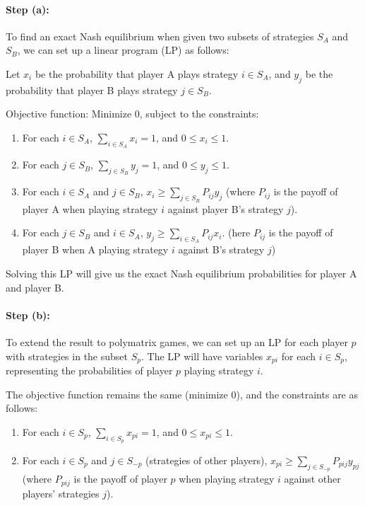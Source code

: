 \documentclass{article}
\begin{document}
\paragraph{Step (a):}
To find an exact Nash equilibrium when given two subsets of strategies $S_A$ and $S_B$, we can set up a linear program (LP) as follows:

Let $x_i$ be the probability that player A plays strategy $i \in S_A$, and $y_j$ be the probability that player B plays strategy $j \in S_B$.

Objective function:
Minimize $0$, subject to the constraints:

\begin{enumerate}
    \item For each $i \in S_A$, $\sum_{i \in S_A} x_i = 1$, and $0 \le x_i \le 1$.
    \item For each $j \in S_B$, $\sum_{j \in S_B} y_j = 1$, and $0 \le y_j \le 1$.
    \item For each $i \in S_A$ and $j \in S_B$, $x_i \geq \sum_{j \in S_B} P_{ij} y_j$ (where $P_{ij}$ is the payoff of player A when playing strategy $i$ against player B's strategy $j$).
    \item For each $j \in S_B$ and $i \in S_A$, $y_j \geq \sum_{i \in S_A} P_{ij} x_i$. (here $P_{ij}$ is the payoff of player B when A playing strategy $i$ against B's strategy $j$)
\end{enumerate}

Solving this LP will give us the exact Nash equilibrium probabilities for player A and player B.

\paragraph{Step (b):}
To extend the result to polymatrix games, we can set up an LP for each player $p$ with strategies in the subset $S_p$. The LP will have variables $x_{pi}$ for each $i \in S_p$, representing the probabilities of player $p$ playing strategy $i$.

The objective function remains the same (minimize $0$), and the constraints are as follows:


\begin{enumerate}
    \item For each $i \in S_p$, $\sum_{i \in S_p} x_{pi} = 1$, and $0 \le x_{pi} \le 1$.
    \item For each $i \in S_p$ and $j \in S_{-p}$ (strategies of other players), $x_{pi} \geq \sum_{j \in S_{-p}} P_{pij} y_{pj}$ (where $P_{pij}$ is the payoff of player $p$ when playing strategy $i$ against other players' strategies $j$).
\end{enumerate}
\end{document}

